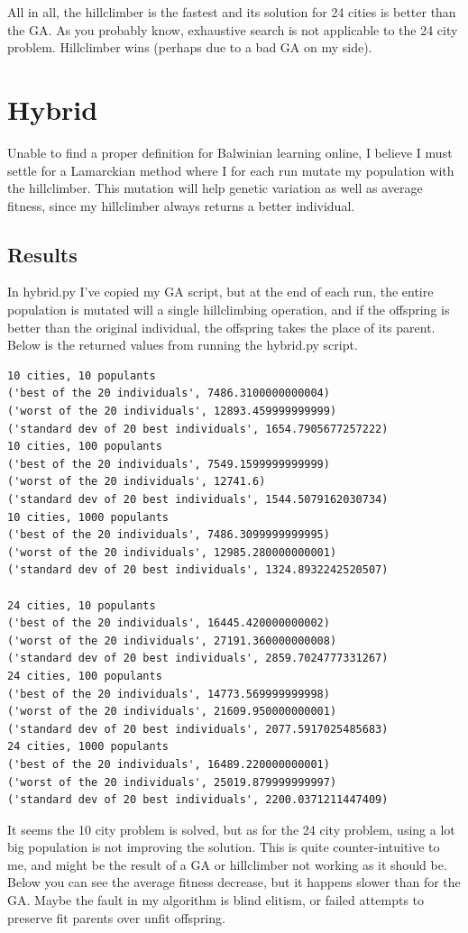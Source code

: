 \documentclass[10pt, a4paper]{article}
\begin{document}
All in all, the hillclimber is the fastest and its solution for 24 cities is better than the GA. As you probably know, exhaustive search is not applicable to the 24 city problem.
Hillclimber wins (perhaps due to a bad GA on my side).
\clearpage
\section{Hybrid}
Unable to find a proper definition for Balwinian learning online, I believe I must settle for a Lamarckian method where I for each run mutate my population with the hillclimber.
This mutation will help genetic variation as well as average fitness, since my hillclimber always returns a better individual.


\subsection{Results}
In hybrid.py I've copied my GA script, but at the end of each run, the entire population is mutated will a single hillclimbing operation, and if the offspring is better than the original individual, the offspring takes the place of its parent.
Below is the returned values from running the hybrid.py script.
\begin{lstlisting}
10 cities, 10 populants
('best of the 20 individuals', 7486.3100000000004)
('worst of the 20 individuals', 12893.459999999999)
('standard dev of 20 best individuals', 1654.7905677257222)
10 cities, 100 populants
('best of the 20 individuals', 7549.1599999999999)
('worst of the 20 individuals', 12741.6)
('standard dev of 20 best individuals', 1544.5079162030734)
10 cities, 1000 populants
('best of the 20 individuals', 7486.3099999999995)
('worst of the 20 individuals', 12985.280000000001)
('standard dev of 20 best individuals', 1324.8932242520507)

24 cities, 10 populants
('best of the 20 individuals', 16445.420000000002)
('worst of the 20 individuals', 27191.360000000008)
('standard dev of 20 best individuals', 2859.7024777331267)
24 cities, 100 populants
('best of the 20 individuals', 14773.569999999998)
('worst of the 20 individuals', 21609.950000000001)
('standard dev of 20 best individuals', 2077.5917025485683)
24 cities, 1000 populants
('best of the 20 individuals', 16489.220000000001)
('worst of the 20 individuals', 25019.879999999997)
('standard dev of 20 best individuals', 2200.0371211447409)
\end{lstlisting}
It seems the 10 city problem is solved, but as for the 24 city problem, using a lot big population is not improving the solution.
This is quite counter-intuitive to me, and might be the result of a GA or hillclimber not working as it should be. Below you can see the average fitness
decrease, but it happens slower than for the GA. Maybe the fault in my algorithm is blind elitism, or failed attempts to preserve fit parents over unfit offspring.
\end{document}
